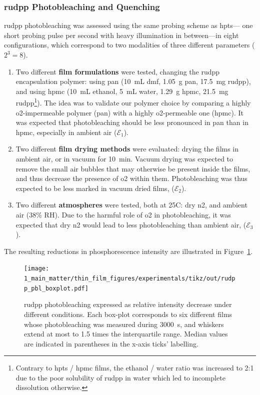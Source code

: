 \subsubsection{\texorpdfstring{\gls{rudpp}}{Rudpp} Photobleaching and Quenching}\label{subsect:thin_film:experimental:pbl:rudpp}

\gls{rudpp} photobleaching was assessed using the same probing scheme as \gls{hpts}---\ie{} one short probing pulse per second with heavy illumination in between---in eight configurations, which correspond to two modalities of three different parameters ($2^3=8$).
\begin{enumerate}
	\item Two different \textbf{film formulations} were tested, changing the \gls{rudpp} encapsulation polymer: using \gls{pan} (10~mL \gls{dmf}, 1.05~g \gls{pan}, 17.5~mg \gls{rudpp}), and using \gls{hpmc} (10~mL ethanol, 5~mL water, 1.29~g \gls{hpmc}, 21.5~mg \gls{rudpp}\footnote{Contrary to \gls{hpts} / \gls{hpmc} films, the ethanol / water ratio was increased to 2:1 due to the poor solubility of \gls{rudpp} in water which led to incomplete dissolution otherwise.}). The idea was to validate our polymer choice by comparing a highly \gls{o2}-impermeable polymer (\gls{pan}) with a highly \gls{o2}-permeable one (\gls{hpmc}). It was expected that photobleaching should be less pronounced in \gls{pan} than in \gls{hpmc}, especially in ambient air ($\mathcal{E}_1$).
	\item Two different \textbf{film drying methods} were evaluated: drying the films in ambient air, or in vacuum for 10~min. Vacuum drying was expected to remove the small air bubbles that may otherwise be present inside the films, and thus decrease the presence of \gls{o2} within them. Photobleaching was thus expected to be less marked in vacuum dried films, ($\mathcal{E}_2$).
	\item Two different \textbf{atmospheres} were tested, both at 25{\degree}C: dry \gls{n2}, and ambient air (38\% RH). Due to the harmful role of \gls{o2} in photobleaching, it was expected that dry \gls{n2} would lead to less photobleaching than ambient air, ($\mathcal{E}_3$).
\end{enumerate}
The resulting reductions in phosphorescence intensity are illustrated in Figure~\ref{fig:thin_film:experimental:rudpp_pbl_boxplot}.

\begin{figure}
	\centering
	\texttt{[image: 1\_main\_matter/thin\_film\_figures/experimentals/tikz/out/rudpp\_pbl\_boxplot.pdf]}
	\caption[Box-plot of \gls{rudpp} photobleaching in different conditions.]{\gls{rudpp} photobleaching expressed as relative intensity decrease under different conditions. Each box-plot corresponds to six different films whose photobleaching was measured during 3000~s, and whiskers extend at most to 1.5 times the interquartile range. Median values are indicated in parentheses in the x-axis ticks' labelling.}
	\label{fig:thin_film:experimental:rudpp_pbl_boxplot}
\end{figure}

